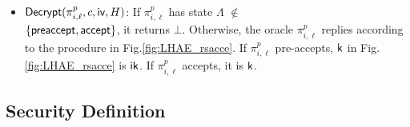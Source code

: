 \begin{itemize}
 \item {$\mathsf{Decrypt}(\pi^p_{i, \ell}, c, \mathsf{iv}, H)$:
 If $\pi^p_{i,\ell}$ has state
 $\Lambda$ $\not\in$ \\ $\{\mathsf{preaccept}, \mathsf{accept}\}$,
 it returns $\bot$.
 Otherwise, the oracle $\pi^p_{i, \ell}$ replies according to the
 procedure in Fig.\ref{fig:LHAE_rsacce}.
 If $\pi^p_{i,\ell}$ pre-accepts,
 $\mathsf{k}$ in Fig.\ref{fig:LHAE_rsacce} is $\mathsf{ik}$. If $\pi^p_{i,\ell}$ accepts, it is $\mathsf{k}$.}
\end{itemize}

\begin{figure*}[!htb]
\begin{center}
\caption{Encrypt and Decrypt oracle in the RSACCE security experiment}
 \label{fig:LHAE_rsacce}
\end{center}
\end{figure*}

\subsection{Security Definition} \label{sec:sec_def}

